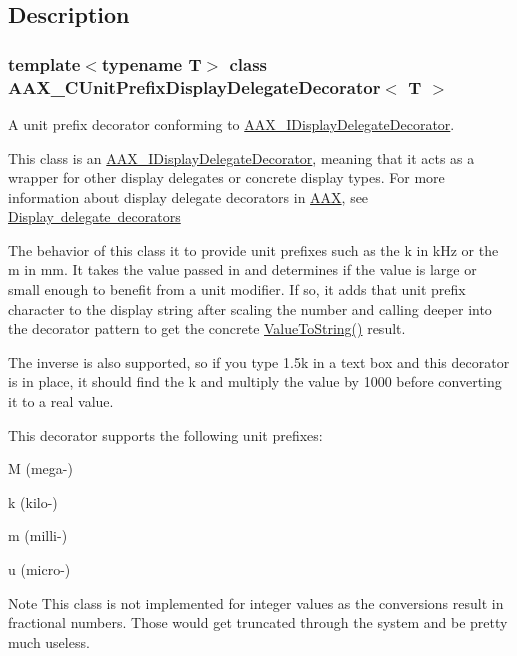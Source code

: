 \subsection{Description}
\subsubsection*{template$<$typename T$>$\newline
class A\+A\+X\+\_\+\+C\+Unit\+Prefix\+Display\+Delegate\+Decorator$<$ T $>$}

A unit prefix decorator conforming to \mbox{\hyperlink{a01805}{A\+A\+X\+\_\+\+I\+Display\+Delegate\+Decorator}}. 

This class is an \mbox{\hyperlink{a01805}{A\+A\+X\+\_\+\+I\+Display\+Delegate\+Decorator}}, meaning that it acts as a wrapper for other display delegates or concrete display types. For more information about display delegate decorators in \mbox{\hyperlink{a00852}{A\+AX}}, see \mbox{\hyperlink{a00816_displaydelegates_decorators}{Display delegate decorators}}

The behavior of this class it to provide unit prefixes such as the k in k\+Hz or the m in mm. It takes the value passed in and determines if the value is large or small enough to benefit from a unit modifier. If so, it adds that unit prefix character to the display string after scaling the number and calling deeper into the decorator pattern to get the concrete \mbox{\hyperlink{a01589_a74d63ddd342455674e9b1b00dc0f76e2}{Value\+To\+String()}} result.

The inverse is also supported, so if you type 1.\+5k in a text box and this decorator is in place, it should find the k and multiply the value by 1000 before converting it to a real value.

This decorator supports the following unit prefixes\+: \begin{DoxyItemize}
\item M (mega-\/) \item k (kilo-\/) \item m (milli-\/) \item u (micro-\/)\end{DoxyItemize}
\begin{DoxyNote}{Note}
This class is not implemented for integer values as the conversions result in fractional numbers. Those would get truncated through the system and be pretty much useless. 
\end{DoxyNote}

